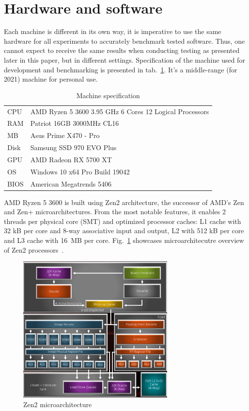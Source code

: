\clearpage
\section{Hardware and software} 
Each machine is different in its own way, it is imperative to use the same hardware for all experiments to accurately benchmark tested software. Thus, one cannot expect to receive the same results when conducting testing as presented later in this paper, but in different settings. Specification of the machine used for development and benchmarking is presented in tab.~\ref{tab:HardSpec}. It's a middle-range (for 2021) machine for personal use.
\begin{table}[!ht]
    \centering
    \caption{Machine specification}
		\label{tab:HardSpec}
    \begin{tabular}{ll}
			\toprule
			CPU  & AMD Ryzen 5 3600 3.95 GHz 6 Cores 12 Logical Processors \\
			RAM  & Patriot 16GB 3000MHz CL16 \\ 
			MB   & Asus Prime X470 - Pro \\ 
			Disk & Samsung SSD 970 EVO Plus \\
			GPU  & AMD Radeon RX 5700 XT \\ 
			OS   & Windows 10 x64 Pro Build 19042 \\ 
			BIOS & American Megatrends 5406 \\ 
			\bottomrule
    \end{tabular}
\end{table}

AMD Ryzen 5 3600 is built using Zen2 architecture, the successor of AMD's Zen and Zen+ microarchitectures. From the most notable features, it enables 2 threads per physical core (SMT) and optimized processor caches: L1 cache with 32 kB per core and 8-way associative input and output, L2 with 512 kB per core and L3 cache with 16 MB per core. Fig.~\ref{fig:Zen} showcases microarchitecutre overview of Zen2 processors~\cite{Zen}.

\begin{figure}[!ht]
	\centering
		\includegraphics[width = 0.7\textwidth]{figures03/Zen.PNG}
	\caption{Zen2 microarchitecture}
	\label{fig:Zen}
\end{figure}

